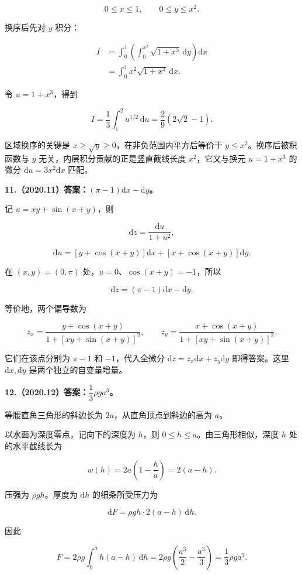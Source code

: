 \documentclass[UTF8,11pt,fontset=windows]{ctexart}
\begin{document}
$$
0\le x\le1,\qquad0\le y\le x^2.
$$

换序后先对 $y$ 积分：

$$
\begin{aligned}
I&=\int_0^1\left(\int_0^{x^2}\sqrt{1+x^3}\,\mathrm dy\right)\mathrm dx\\
&=\int_0^1x^2\sqrt{1+x^3}\,\mathrm dx.
\end{aligned}
$$

令 $u=1+x^3$，得到

$$
I=\frac13\int_1^2u^{1/2}\,\mathrm du
=\frac29(2\sqrt2-1).
$$

区域换序的关键是 $x\ge\sqrt y\ge0$，在非负范围内平方后等价于 $y\le x^2$。换序后被积函数与 $y$ 无关，内层积分贡献的正是竖直截线长度 $x^2$，它又与换元 $u=1+x^3$ 的微分 $\mathrm du=3x^2\mathrm dx$ 匹配。

\clearpage

\textbf{11.（2020.11）答案：$(\pi-1)\mathrm dx-\mathrm dy$。}

记 $u=xy+\sin(x+y)$，则

$$
\mathrm dz=\frac{\mathrm du}{1+u^2},
$$

$$
\mathrm du=[y+\cos(x+y)]\mathrm dx+[x+\cos(x+y)]\mathrm dy.
$$

在 $(x,y)=(0,\pi)$ 处，$u=0$、$\cos(x+y)=-1$，所以

$$
\mathrm dz=(\pi-1)\mathrm dx-\mathrm dy.
$$

等价地，两个偏导数为

$$
z_x=\frac{y+\cos(x+y)}{1+[xy+\sin(x+y)]^2},
\qquad
z_y=\frac{x+\cos(x+y)}{1+[xy+\sin(x+y)]^2}.
$$

它们在该点分别为 $\pi-1$ 和 $-1$，代入全微分 $\mathrm dz=z_x\mathrm dx+z_y\mathrm dy$ 即得答案。这里 $\mathrm dx,\mathrm dy$ 是两个独立的自变量增量。

\clearpage

\textbf{12.（2020.12）答案：$\dfrac13\rho ga^3$。}

等腰直角三角形的斜边长为 $2a$，从直角顶点到斜边的高为 $a$。

以水面为深度零点，记向下的深度为 $h$，则 $0\le h\le a$。由三角形相似，深度 $h$ 处的水平截线长为

$$
w(h)=2a\left(1-\frac ha\right)=2(a-h).
$$

压强为 $\rho gh$。厚度为 $\mathrm dh$ 的细条所受压力为

$$
\mathrm dF=\rho gh\cdot2(a-h)\,\mathrm dh.
$$

因此

$$
F=2\rho g\int_0^a h(a-h)\,\mathrm dh
=2\rho g\left(\frac{a^3}{2}-\frac{a^3}{3}\right)
=\frac13\rho ga^3.
$$
\end{document}
